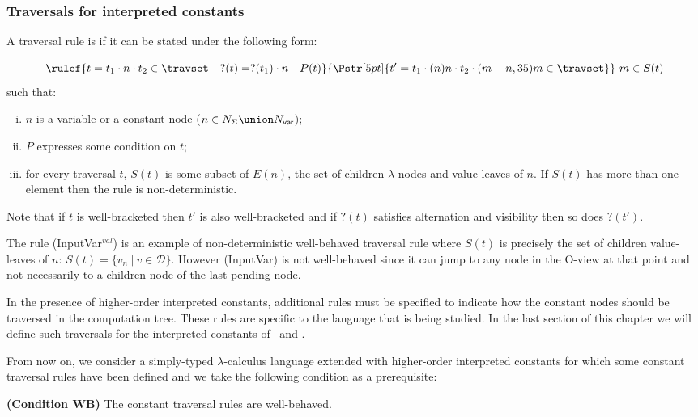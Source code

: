 \subsubsection{Traversals for interpreted constants}

\begin{definition}
\label{def:wellbehaved_traversal} A traversal rule is
 if it can be stated under the following form:
$$\rulef{t = t_1\cdot n \cdot t_2 \in \travset \quad ?(t) = ?(t_1) \cdot n \quad P(t)}
  { \stackrel{  \rule{0pt}{3pt} }{\Pstr[5pt]{ t' = t_1\cdot (n){n} \cdot t_2 \cdot (m-n,35){m} \in \travset}}
   }
    \ m\in S(t)
   $$
such that:
\begin{enumerate}[i.]
  \item $n$ is a variable or a constant node ($n \in N_{\Sigma}\union N_{\sf var}$);
  \item $P$ expresses some condition on $t$;
  \item for every traversal $t$, $S(t)$ is some subset of $E(n)$, the set of children $\lambda$-nodes and value-leaves of $n$.
  If $S(t)$ has more than one element then the rule is non-deterministic.
\end{enumerate}
\end{definition}
Note that if $t$ is well-bracketed then $t'$ is also well-bracketed
and if $?(t)$ satisfies alternation and visibility then so does
$?(t')$.


\begin{example} The rule (InputVar$^{val}$) is an example of non-deterministic well-behaved traversal rule where $S(t)$ is precisely the set of children value-leaves of $n$:
$S(t) = \{ v_n \ | \ v \in \mathcal{D} \} $.
However (InputVar) is not well-behaved since it can jump to any node in the O-view at that point and not necessarily to a children node of the last pending node.
\end{example}

In the presence of higher-order interpreted constants, additional rules must be specified to indicate how
the constant nodes should be traversed in the computation tree. These rules
are specific to the language that is being studied.
In the last section of this chapter we will define such traversals for the interpreted constants of
\pcf\ and \ialgol.

From now on, we consider a simply-typed $\lambda$-calculus language extended with
higher-order interpreted constants for which some constant traversal rules have been defined
and we take the following condition as a prerequisite:
\begin{center}
  \textbf{(Condition WB)} The constant traversal rules are well-behaved.
\end{center}



